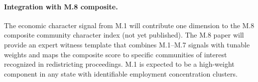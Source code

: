 \paragraph{Integration with M.8 composite.}
The economic character signal from M.1 will contribute one dimension to
the M.8 composite community character index (not yet published).
The M.8 paper will provide an expert witness template that combines M.1--M.7
signals with tunable weights and maps the composite score to specific
communities of interest recognized in redistricting proceedings.
M.1 is expected to be a high-weight component in any state with identifiable
employment concentration clusters.
